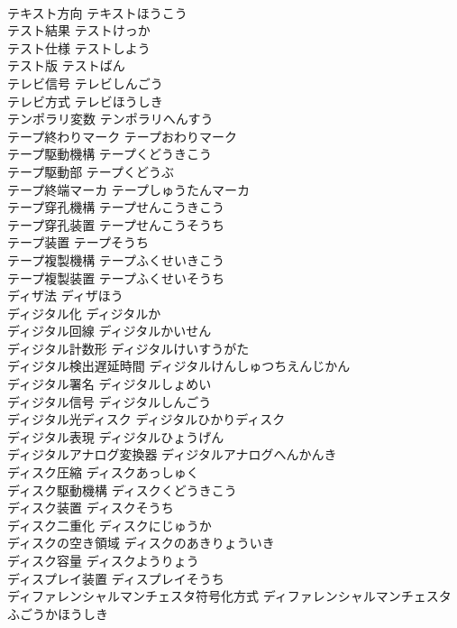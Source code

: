 \documentclass[8pt]{extreport}
\begin{document}
\begin{CJK}{UTF8}{min}
\\	テキスト方向	テキストほうこう	
\\	テスト結果	テストけっか	
\\	テスト仕様	テストしよう	
\\	テスト版	テストばん	
\\	テレビ信号	テレビしんごう	
\\	テレビ方式	テレビほうしき	
\\	テンポラリ変数	テンポラリへんすう	
\\	テープ終わりマーク	テープおわりマーク	
\\	テープ駆動機構	テープくどうきこう	
\\	テープ駆動部	テープくどうぶ	
\\	テープ終端マーカ	テープしゅうたんマーカ	
\\	テープ穿孔機構	テープせんこうきこう	
\\	テープ穿孔装置	テープせんこうそうち	
\\	テープ装置	テープそうち	
\\	テープ複製機構	テープふくせいきこう	
\\	テープ複製装置	テープふくせいそうち	
\\	ディザ法	ディザほう	
\\	ディジタル化	ディジタルか	
\\	ディジタル回線	ディジタルかいせん	
\\	ディジタル計数形	ディジタルけいすうがた	
\\	ディジタル検出遅延時間	ディジタルけんしゅつちえんじかん	
\\	ディジタル署名	ディジタルしょめい	
\\	ディジタル信号	ディジタルしんごう	
\\	ディジタル光ディスク	ディジタルひかりディスク	
\\	ディジタル表現	ディジタルひょうげん	
\\	ディジタルアナログ変換器	ディジタルアナログへんかんき	
\\	ディスク圧縮	ディスクあっしゅく	
\\	ディスク駆動機構	ディスクくどうきこう	
\\	ディスク装置	ディスクそうち	
\\	ディスク二重化	ディスクにじゅうか	
\\	ディスクの空き領域	ディスクのあきりょういき	
\\	ディスク容量	ディスクようりょう	
\\	ディスプレイ装置	ディスプレイそうち	
\\	ディファレンシャルマンチェスタ符号化方式	ディファレンシャルマンチェスタふごうかほうしき	

\end{CJK}
\end{document}
